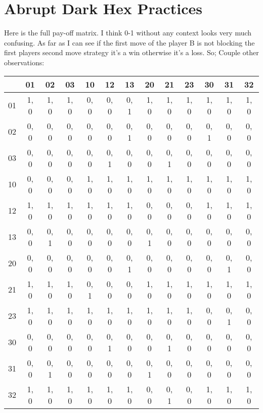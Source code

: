 

\section{Abrupt Dark Hex Practices}

Here is the full pay-off matrix. I think 0-1 without any context looks very much confusing. As far as I can see if the first move of the player B is not blocking the first players second move strategy it's a win otherwise it's a loss. So;  
Couple other observations:

\begin{tabular}{|c||c|c|c||c|c|c||c|c|c||c|c|c|}
	\hline 
	   & 01   & 02   & 03 	&  10  &  12  &   13 &   20 &   21 &   23 &   30 &   31 &   32 \\ 
	\hline 
	\hline 
	01 & 1, 0 & 1, 0 & 1, 0 & 0, 0 & 0, 0 & 0, 1 & 1, 0 & 1, 0 & 1, 0 & 1, 0 & 1, 0 & 1, 0 \\ 
	\hline 
	02 & 0, 0 & 0, 0 & 0, 0 & 0, 0 & 0, 0 & 0, 1 & 0, 0 & 0, 0 & 0, 0 & 0, 1 & 0, 0 & 0, 0 \\ 
	\hline 
	03 & 0, 0 & 0, 0 & 0, 0 & 0, 0 & 0, 1 & 0, 0 & 0, 0 & 0, 1 & 0, 0 & 0, 0 & 0, 0 & 0, 0  \\ 
	\hline 
	\hline 
	10 & 0, 0 & 0, 0 & 0, 0 & 1, 0 & 1, 0 & 1, 0 & 1, 0 & 1, 0 & 1, 0 & 1, 0 & 1, 0 & 1, 0 \\ 
	\hline 
	12 & 1, 0 & 1, 0 & 1, 0 & 1, 0 & 1, 0 & 1, 0 & 0, 0 & 0, 0 & 0, 0 & 1, 0 & 1, 0 & 1, 0 \\ 
	\hline 
	13 & 0, 0 & 0, 1 & 0, 0 & 0, 0 & 0, 0 & 0, 0 & 0, 1 & 0, 0 & 0, 0 & 0, 0 & 0, 0 & 0, 0 \\ 
	\hline 
	\hline 
	20 & 0, 0 & 0, 0 & 0, 0 & 0, 0 & 0, 0 & 0, 1 & 0, 0 & 0, 0 & 0, 0 & 0, 0 & 0, 1 & 0, 0 \\ 
	\hline 
	21 & 1, 0 & 1, 0 & 1, 0 & 0, 1 & 0, 0 & 0, 0 & 1, 0 & 1, 0 & 1, 0 & 1, 0 & 1, 0 & 1, 0 \\ 
	\hline 
	23 & 1, 0 & 1, 0 & 1, 0 & 1, 0 & 1, 0 & 1, 0 & 1, 0 & 1, 0 & 1, 0 & 0, 0 & 0, 1 & 0, 0 \\ 
	\hline 
	\hline 
	30 & 0, 0 & 0, 0 & 0, 0 & 0, 0 & 0, 1 & 0, 0 & 0, 0 & 0, 1 & 0, 0 & 0, 0 & 0, 0 & 0, 0 \\ 
	\hline 
	31 & 0, 0 & 0, 1 & 0, 0 & 0, 0 & 0, 0 & 0, 0 & 0, 1 & 0, 0 & 0, 0 & 0, 0 & 0, 0 & 0, 0 \\ 
	\hline 
	32 & 1, 0 & 1, 0 & 1, 0 & 1, 0 & 1, 0 & 1, 0 & 0, 0 & 0, 1 & 0, 0 & 1, 0 & 1, 0 & 1, 0 \\  
	\hline 
\end{tabular} 





